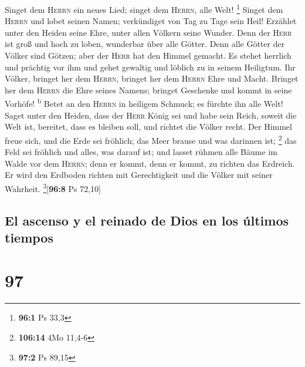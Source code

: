  Singet dem \textsc{Herrn} ein neues Lied; singet dem
\textsc{Herrn}, alle Welt! \footnote{\textbf{96:1} Ps 33,3}
 Singet dem \textsc{Herrn} und lobet seinen Namen;
verkündiget von Tag zu Tage sein Heil!  Erzählet unter den
Heiden seine Ehre, unter allen Völkern seine Wunder.  Denn
der \textsc{Herr} ist groß und hoch zu loben, wunderbar über alle
Götter.  Denn alle Götter der Völker sind Götzen; aber der
\textsc{Herr} hat den Himmel gemacht.  Es stehet herrlich
und prächtig vor ihm und gehet gewaltig und löblich zu in seinem
Heiligtum.  Ihr Völker, bringet her dem \textsc{Herrn},
bringet her dem \textsc{Herrn} Ehre und Macht.  Bringet
her dem \textsc{Herrn} die Ehre seines Namens; bringet Geschenke und
kommt in seine Vorhöfe! \textsuperscript{b}  Betet an den
\textsc{Herrn} in heiligem Schmuck; es fürchte ihn alle Welt!
 Saget unter den Heiden, dass der \textsc{Herr} König sei
und habe sein Reich, soweit die Welt ist, bereitet, dass es bleiben
soll, und richtet die Völker recht.  Der Himmel freue
sich, und die Erde sei fröhlich; das Meer brause und was darinnen ist;
\footnote{\textbf{106:14} 4Mo 11,4-6}  das Feld sei
fröhlich und alles, was darauf ist; und lasset rühmen alle Bäume im
Walde  vor dem \textsc{Herrn}; denn er kommt, denn er
kommt, zu richten das Erdreich. Er wird den Erdboden richten mit
Gerechtigkeit und die Völker mit seiner Wahrheit.
\footnote{\textbf{97:2} Ps 89,15}{[}\textbf{96:8} Ps 72,10{]}

\hypertarget{el-ascenso-y-el-reinado-de-dios-en-los-uxfaltimos-tiempos}{%
\subsection{El ascenso y el reinado de Dios en los últimos
tiempos}\label{el-ascenso-y-el-reinado-de-dios-en-los-uxfaltimos-tiempos}}

\hypertarget{section-96}{%
\section{97}\label{section-96}}

